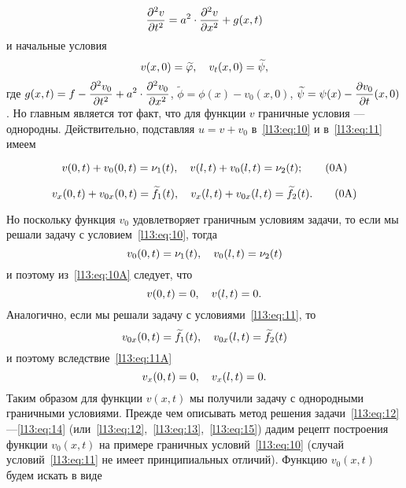 \begin{equation}\label{l13:eq:12}
	\hfill\pdder{v}{t}=a^2\cdot\pdder{v}{x}+g(x,t)\hfill
\end{equation}
и начальные условия
\begin{equation}\label{l13:eq:13}
	\hfill v(x,0)=\widetilde{\phi},\quad v_t(x,0)=\widetilde{\psi},\hfill
\end{equation}
где $\displaystyle g(x,t)=f-\frac{\partial^2v_0}{\partial t^2}+a^2\cdot\frac{\partial^2v_0}{\partial x^2}$, $\widetilde{\phi}=\phi(x)-v_0(x,0)$, $\displaystyle\widetilde{\psi}=\psi(x)-\frac{\partial v_0}{\partial t}(x,0)$. Но главным является тот факт, что для функции $v$ граничные условия --- однородны. Действительно, подставляя $u=v+v_0$ в~\eqref{l13:eq:10} и в~\eqref{l13:eq:11} имеем\addtocounter{equation}{-3}
\begin{equation}\label{l13:eq:10A}
	\hfill v(0,t)+v_0(0,t)=\nu_1(t),\quad v(l,t)+v_0(l,t)=\nu_2(t);\hfill\tag{\theequation A}
\end{equation}\addtocounter{equation}{1}
\begin{equation}\label{l13:eq:11A}
	\hfill v_x(0,t)+v_{0x}(0,t)=\widetilde{f}_1(t),\quad v_x(l,t)+v_{0x}(l,t)=\widetilde{f}_2(t).\hfill\tag{\theequation A}
\end{equation}\addtocounter{equation}{2}
Но поскольку функция $v_0$ удовлетворяет граничным условиям задачи, то если мы решали задачу с условием~\eqref{l13:eq:10}, тогда
\begin{equation*}
	\hfill v_0(0,t)=\nu_1(t),\quad v_0(l,t)=\nu_2(t)\hfill
\end{equation*} 
и поэтому из~\eqref{l13:eq:10A} следует, что
\begin{equation}\label{l13:eq:14}
	\hfill v(0,t)=0,\quad v(l,t)=0.\hfill
\end{equation}
Аналогично, если мы решали задачу с условиями~\eqref{l13:eq:11}, то 
\begin{equation*}
	\hfill v_{0x}(0,t)=\widetilde{f}_1(t),\quad v_{0x}(l,t)=\widetilde{f}_2(t)\hfill
\end{equation*} 
и поэтому вследствие~\eqref{l13:eq:11A} 
\begin{equation}\label{l13:eq:15}
	\hfill v_x(0,t)=0,\quad v_x(l,t)=0.\hfill
\end{equation}
Таким образом для функции $v(x,t)$ мы получили задачу с однородными граничными условиями. Прежде чем описывать метод решения задачи~\eqref{l13:eq:12}---\eqref{l13:eq:14} (или~\eqref{l13:eq:12},~\eqref{l13:eq:13},~\eqref{l13:eq:15}) дадим рецепт построения функции $v_0(x,t)$ на примере граничных условий~\eqref{l13:eq:10} (случай условий~\eqref{l13:eq:11} не имеет принципиальных отличий). Функцию $v_0(x,t)$ будем искать в виде

